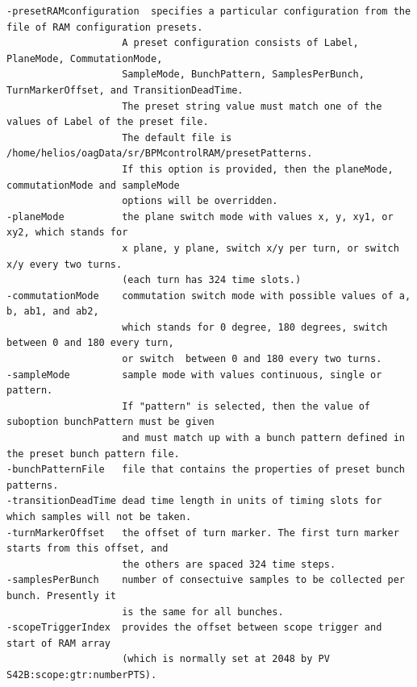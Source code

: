 \begin{itemize}
\begin{verbatim}
-presetRAMconfiguration  specifies a particular configuration from the file of RAM configuration presets.
                    A preset configuration consists of Label, PlaneMode, CommutationMode, 
                    SampleMode, BunchPattern, SamplesPerBunch, TurnMarkerOffset, and TransitionDeadTime. 
                    The preset string value must match one of the values of Label of the preset file. 
                    The default file is /home/helios/oagData/sr/BPMcontrolRAM/presetPatterns. 
                    If this option is provided, then the planeMode, commutationMode and sampleMode 
                    options will be overridden. 
-planeMode          the plane switch mode with values x, y, xy1, or xy2, which stands for 
                    x plane, y plane, switch x/y per turn, or switch x/y every two turns. 
                    (each turn has 324 time slots.) 
-commutationMode    commutation switch mode with possible values of a, b, ab1, and ab2, 
                    which stands for 0 degree, 180 degrees, switch between 0 and 180 every turn, 
                    or switch  between 0 and 180 every two turns. 
-sampleMode         sample mode with values continuous, single or pattern.
                    If "pattern" is selected, then the value of suboption bunchPattern must be given
                    and must match up with a bunch pattern defined in the preset bunch pattern file.
-bunchPatternFile   file that contains the properties of preset bunch patterns. 
-transitionDeadTime dead time length in units of timing slots for which samples will not be taken. 
-turnMarkerOffset   the offset of turn marker. The first turn marker starts from this offset, and 
                    the others are spaced 324 time steps. 
-samplesPerBunch    number of consectuive samples to be collected per bunch. Presently it 
                    is the same for all bunches. 
-scopeTriggerIndex  provides the offset between scope trigger and start of RAM array 
                    (which is normally set at 2048 by PV S42B:scope:gtr:numberPTS). 


\end{verbatim}
\end{itemize}
